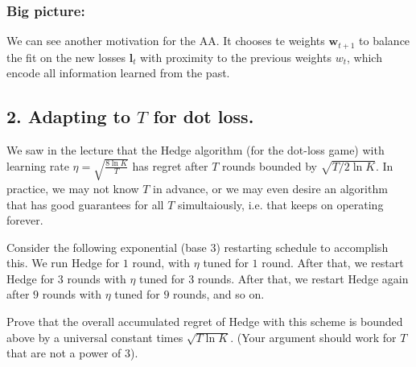 \documentclass[10pt, a4paper, twoside]{amsart}
\theoremstyle{plain}
\begin{document}
\subsubsection*{Big picture:}
We can see another motivation for the AA. It chooses te weights $\mathbf{w}_{t+1}$ to balance the fit on the new losses $\mathbf{l}_t$ with proximity to the previous weights $w_t$, which encode all information learned from the past. 

\subsection*{2. Adapting to $T$ for dot loss.}
We saw in the lecture that the Hedge algorithm (for the dot-loss game) with learning rate $\eta = \sqrt{\frac{8\ln K}{T}}$ has regret after $T$ rounds bounded by $\sqrt{T/ 2 \ln K}$. In practice, we may not know $T$ in advance, or we may even desire an algorithm that has good guarantees for all $T$ simultaiously, i.e. that keeps on operating forever.

Consider the following exponential (base $3$) restarting schedule to accomplish this. We run Hedge for $1$ round, with $\eta$ tuned for $1$ round. After that, we restart Hedge for $3$ rounds with $\eta$ tuned for $3$ rounds. After that, we restart Hedge again after $9$ rounds with $\eta$ tuned for $9$ rounds, and so on.

Prove that the overall accumulated regret of Hedge with this scheme is bounded above by a universal constant times $\sqrt{T \ln K}$. (Your argument should work for $T$ that are not a power of $3$).
\end{document}
